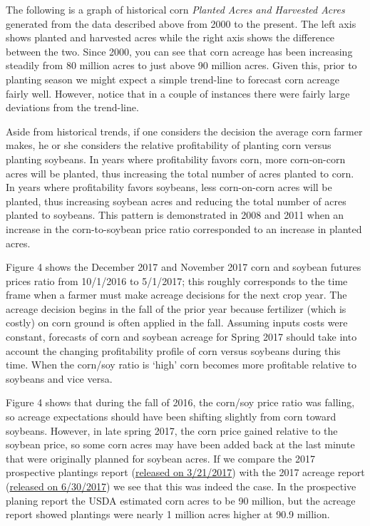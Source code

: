 \documentclass[
]{book}
\begin{document}
The following is a graph of historical corn \emph{Planted Acres and Harvested Acres} generated from the data described above from 2000 to the present. The left axis shows planted and harvested acres while the right axis shows the difference between the two. Since 2000, you can see that corn acreage has been increasing steadily from 80 million acres to just above 90 million acres. Given this, prior to planting season we might expect a simple trend-line to forecast corn acreage fairly well. However, notice that in a couple of instances there were fairly large deviations from the trend-line.

Aside from historical trends, if one considers the decision the average corn farmer makes, he or she considers the relative profitability of planting corn versus planting soybeans. In years where profitability favors corn, more corn-on-corn acres will be planted, thus increasing the total number of acres planted to corn. In years where profitability favors soybeans, less corn-on-corn acres will be planted, thus increasing soybean acres and reducing the total number of acres planted to soybeans. This pattern is demonstrated in 2008 and 2011 when an increase in the corn-to-soybean price ratio corresponded to an increase in planted acres.

Figure 4 shows the December 2017 and November 2017 corn and soybean futures prices ratio from 10/1/2016 to 5/1/2017; this roughly corresponds to the time frame when a farmer must make acreage decisions for the next crop year. The acreage decision begins in the fall of the prior year because fertilizer (which is costly) on corn ground is often applied in the fall. Assuming inputs costs were constant, forecasts of corn and soybean acreage for Spring 2017 should take into account the changing profitability profile of corn versus soybeans during this time. When the corn/soy ratio is `high' corn becomes more profitable relative to soybeans and vice versa.

Figure 4 shows that during the fall of 2016, the corn/soy price ratio was falling, so acreage expectations should have been shifting slightly from corn toward soybeans. However, in late spring 2017, the corn price gained relative to the soybean price, so some corn acres may have been added back at the last minute that were originally planned for soybean acres. If we compare the 2017 prospective plantings report (\href{http://usda.mannlib.cornell.edu/usda/current/ProsPlan/ProsPlan-03-31-2017.pdf}{released on 3/21/2017}) with the 2017 acreage report (\href{http://usda.mannlib.cornell.edu/usda/current/Acre/Acre-06-30-2017.pdf}{released on 6/30/2017}) we see that this was indeed the case. In the prospective planing report the USDA estimated corn acres to be 90 million, but the acreage report showed plantings were nearly 1 million acres higher at 90.9 million.
\end{document}
